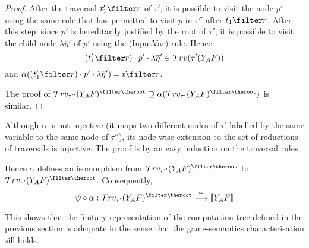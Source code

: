 \documentclass{article}
\newcommand{\sem}[1]{{[\![ #1 ]\!]}}
\newcommand{\travset}{\mathcal{T}rv}
\begin{document}
\begin{proof}
After the traversal $t_1'\filter r$ of $\tau'$, it is possible to
visit the node $p'$ using the same rule that has permitted to visit
$p$ in $\tau''$ after $t_1\filter r$. After this step, since $p'$ is
hereditarily justified by the root of $\tau'$, it is possible to
visit the child node $\lambda \overline{\eta}'$ of $p'$ using the
(InputVar) rule. Hence
$$(t_1'\filter r) \cdot p' \cdot \lambda \overline{\eta}' \in \travset(\tau'(Y_A F)) $$
and $\alpha((t_1'\filter r) \cdot p' \cdot \lambda \overline{\eta}')
= t\filter r$.

The proof of $\travset_{\tau''}(Y_A F)^{\filter \theroot} \supseteq
\alpha(\travset_{\tau'}(Y_A F)^{\filter \theroot})$ is similar.
 \end{proof}

Although $\alpha$ is not injective (it maps two different nodes of $\tau'$ labelled by the same variable to the same node of $\tau''$), its node-wise extension to the set of reductions of traversals is injective.
The proof is by an easy induction on the traversal rules.



Hence $\alpha$ defines an isomorphism from $\travset_{\tau''}(Y_A
F)^{\filter \theroot}$ to $\travset_{\tau'}(Y_A F)^{\filter
\theroot}$. Consequently,
$$ \psi  \circ \alpha : \travset_{\tau'}( Y_A F)^{\filter \theroot} \stackrel{\cong}{\longrightarrow} \sem{Y_A F}$$

This shows that the finitary representation of the computation tree defined in the previous section is adequate in the sense that the game-semantics characterisation sill holds.
\end{document}
